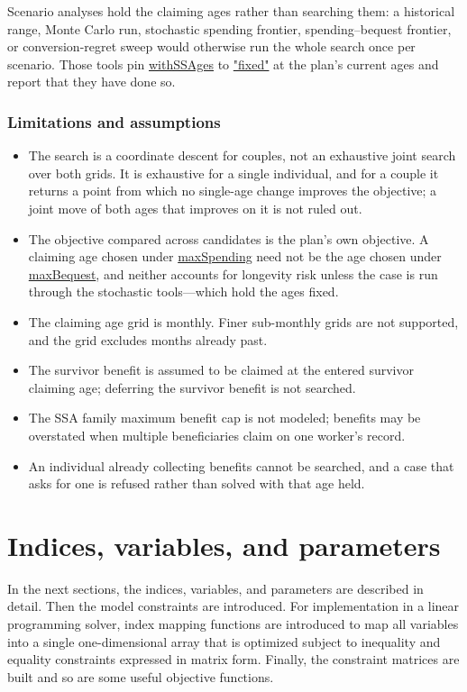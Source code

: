 \documentclass[fleqn,12pt]{report}
\newcommand{\code}[1]{\url{#1}}
\begin{document}
Scenario analyses hold the claiming ages rather than searching them: a historical
range, Monte Carlo run, stochastic spending frontier, spending--bequest frontier,
or conversion-regret sweep would otherwise run the whole search once per
scenario.
Those tools pin \code{withSSAges} to \code{"fixed"} at the plan's current ages
and report that they have done so.

\subsection*{Limitations and assumptions}

\begin{itemize}[nosep]
    \item The search is a coordinate descent for couples, not an exhaustive
          joint search over both grids.  It is exhaustive for a single
          individual, and for a couple it returns a point from which no
          single-age change improves the objective; a joint move of both ages
          that improves on it is not ruled out.
    \item The objective compared across candidates is the plan's own objective.
          A claiming age chosen under \code{maxSpending} need not be the age
          chosen under \code{maxBequest}, and neither accounts for longevity
          risk unless the case is run through the stochastic tools---which hold
          the ages fixed.
    \item The claiming age grid is monthly.  Finer sub-monthly grids are not
          supported, and the grid excludes months already past.
    \item The survivor benefit is assumed to be claimed at the entered survivor
          claiming age; deferring the survivor benefit is not searched.
    \item The SSA family maximum benefit cap is not modeled; benefits may be
          overstated when multiple beneficiaries claim on one worker's record.
    \item An individual already collecting benefits cannot be searched, and a
          case that asks for one is refused rather than solved with that age
          held.
\end{itemize}

\appendix

\chapter{Indices, variables, and parameters}
\label{Chap:Notation}
In the next sections, the indices, variables, and parameters are
described in detail. Then the model constraints are introduced.
For implementation in a linear programming solver, index mapping
functions are introduced to map all variables into a single
one-dimensional array that
is optimized subject to inequality and equality constraints
expressed in matrix form. Finally, the constraint matrices are built
and so are some useful objective functions.
\end{document}
